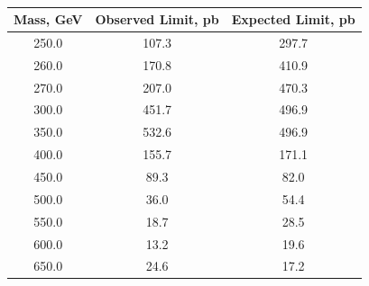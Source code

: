 \begin{table}
\begin{center}
\vspace{1 cm} \ \\
\begin{tabular}{|c|c|c|}
\hline
Mass, GeV &  Observed Limit, pb &  Expected Limit, pb \\
\hline
     250.0 &               107.3 &               297.7 \\
     260.0 &               170.8 &               410.9 \\
     270.0 &               207.0 &               470.3 \\
     300.0 &               451.7 &               496.9 \\
     350.0 &               532.6 &               496.9 \\
     400.0 &               155.7 &               171.1 \\
     450.0 &                89.3 &                82.0 \\
     500.0 &                36.0 &                54.4 \\
     550.0 &                18.7 &                28.5 \\
     600.0 &                13.2 &                19.6 \\
     650.0 &                24.6 &                17.2 \\

\end{tabular}
\end{center}
\end{table}
